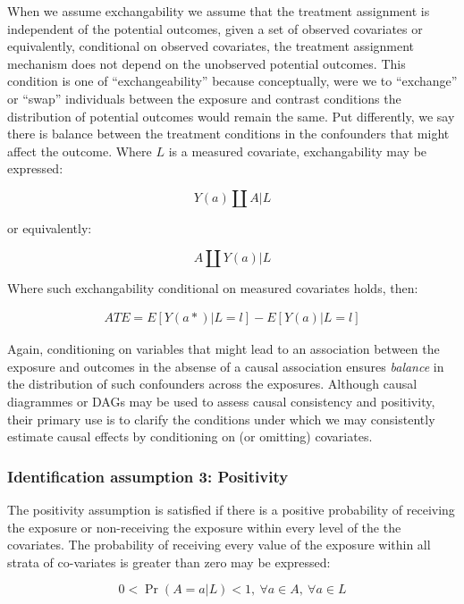 \documentclass[
  singlecolumn]{report}
\begin{document}
When we assume exchangability we assume that the treatment assignment is
independent of the potential outcomes, given a set of observed
covariates or equivalently, conditional on observed covariates, the
treatment assignment mechanism does not depend on the unobserved
potential outcomes. This condition is one of ``exchangeability'' because
conceptually, were we to ``exchange'' or ``swap'' individuals between
the exposure and contrast conditions the distribution of potential
outcomes would remain the same. Put differently, we say there is balance
between the treatment conditions in the confounders that might affect
the outcome. Where \(L\) is a measured covariate, exchangability may be
expressed:

\[Y(a)\coprod  A|L\]

or equivalently:

\[A \coprod  Y(a)|L\]

Where such exchangability conditional on measured covariates holds,
then:

\[
\begin{aligned}
ATE = E[Y(a*)|L = l] - E[Y(a)|L = l] 
\end{aligned}
\]

Again, conditioning on variables that might lead to an association
between the exposure and outcomes in the absense of a causal association
ensures \emph{balance} in the distribution of such confounders across
the exposures. Although causal diagrammes or DAGs may be used to assess
causal consistency and positivity, their primary use is to clarify the
conditions under which we may consistently estimate causal effects by
conditioning on (or omitting) covariates.

\hypertarget{identification-assumption-3-positivity}{%
\subsubsection{Identification assumption 3:
Positivity}\label{identification-assumption-3-positivity}}

The positivity assumption is satisfied if there is a positive
probability of receiving the exposure or non-receiving the exposure
within every level of the the covariates. The probability of receiving
every value of the exposure within all strata of co-variates is greater
than zero may be expressed:

\begin{equation}
0 < \Pr(A=a|L)<1, ~ \forall a \in A, ~ \forall a \in L
\end{equation}
\end{document}
